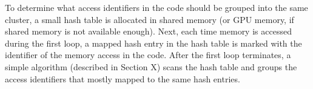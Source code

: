 To determine what access identifiers in the code should be grouped into the same cluster, a small hash table is
allocated in shared memory (or GPU memory, if shared memory is not available enough). Next, each time memory is accessed
during the first loop, a mapped hash entry in the hash table is marked with the identifier of the memory access in the
code. After the first loop terminates, a simple algorithm (described in Section X) scans the hash table and groups the
access identifiers that mostly mapped to the same hash entries.

